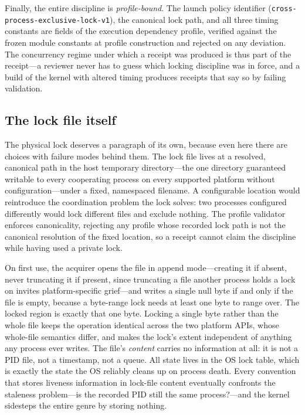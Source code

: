 Finally, the entire discipline is \emph{profile-bound}. The launch policy identifier (\texttt{cross-process-exclusive-lock-v1}), the canonical lock path, and all three timing constants are fields of the execution dependency profile, verified against the frozen module constants at profile construction and rejected on any deviation. The concurrency regime under which a receipt was produced is thus part of the receipt---a reviewer never has to guess which locking discipline was in force, and a build of the kernel with altered timing produces receipts that say so by failing validation.

\subsection{The lock file itself}\label{ch08:lockfile}

The physical lock deserves a paragraph of its own, because even here there are choices with failure modes behind them. The lock file lives at a resolved, canonical path in the host temporary directory---the one directory guaranteed writable to every cooperating process on every supported platform without configuration---under a fixed, namespaced filename. A configurable location would reintroduce the coordination problem the lock solves: two processes configured differently would lock different files and exclude nothing. The profile validator enforces canonicality, rejecting any profile whose recorded lock path is not the canonical resolution of the fixed location, so a receipt cannot claim the discipline while having used a private lock.

On first use, the acquirer opens the file in append mode---creating it if absent, never truncating it if present, since truncating a file another process holds a lock on invites platform-specific grief---and writes a single null byte if and only if the file is empty, because a byte-range lock needs at least one byte to range over. The locked region is exactly that one byte. Locking a single byte rather than the whole file keeps the operation identical across the two platform APIs, whose whole-file semantics differ, and makes the lock's extent independent of anything any process ever writes. The file's \emph{content} carries no information at all: it is not a PID file, not a timestamp, not a queue. All state lives in the OS lock table, which is exactly the state the OS reliably cleans up on process death. Every convention that stores liveness information in lock-file content eventually confronts the staleness problem---is the recorded PID still the same process?---and the kernel sidesteps the entire genre by storing nothing.

